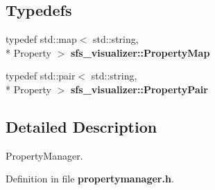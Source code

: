 \subsection*{Typedefs}
\begin{DoxyCompactItemize}
\item 
typedef std\-::map$<$ std\-::string, \\*
Property $>$ {\bfseries sfs\-\_\-visualizer\-::\-Property\-Map}\label{namespacesfs__visualizer_abba0acae5cef561704a039ac50456277}

\item 
typedef std\-::pair$<$ std\-::string, \\*
Property $>$ {\bfseries sfs\-\_\-visualizer\-::\-Property\-Pair}\label{namespacesfs__visualizer_a3b90b8351049b8c60cfa2301ca992c91}

\end{DoxyCompactItemize}


\subsection{Detailed Description}
Property\-Manager. 

Definition in file {\bf propertymanager.\-h}.

